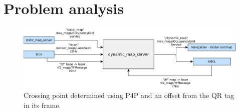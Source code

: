 \chapter{Problem analysis}
\begin{figure}
	\centering
	\includegraphics[width=0.6\linewidth]{figures/dynamic_map_mir_interface}
	\caption{Crossing point determined using P4P and an offset from the QR tag in its frame.}
	\label{fig:dyn_map}
\end{figure}
